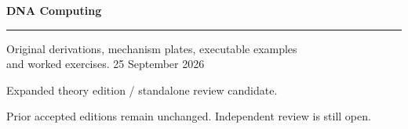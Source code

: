 \documentclass[11pt,oneside,openany]{book}
\theoremstyle{definition}
\theoremstyle{plain}
\begin{document}
\frontmatter
\begin{titlepage}
\color{Blue}\sffamily\vspace*{20mm}
{\Huge\bfseries DNA Computing\par}
\vspace{10mm}{\LARGE Chapter 17\par}
\vspace{8mm}{\Large Watson--Crick and biochemical automata\par}
\vspace{12mm}\rule{\linewidth}{.8pt}
\vspace{6mm}\par Original derivations, mechanism plates, executable examples\\and worked exercises.
\vfill 25 September 2026\par
Expanded theory edition / standalone review candidate.\par
Prior accepted editions remain unchanged. Independent review is still open.
\end{titlepage}
\tableofcontents
\mainmatter
\setcounter{chapter}{16}

\backmatter

\clearpage{}
\printindex
\end{document}
